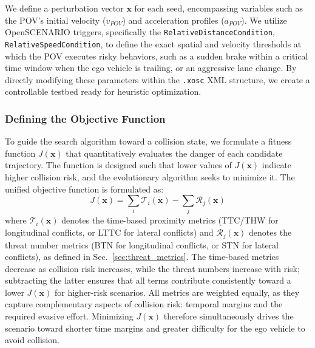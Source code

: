 We define a perturbation vector $\mathbf{x}$ for each seed, encompassing variables such as the POV's initial velocity ($v_{POV}$) and acceleration profiles ($a_{POV}$). We utilize OpenSCENARIO triggers, specifically the \texttt{RelativeDistanceCondition}, \texttt{RelativeSpeedCondition}, to define the exact spatial and velocity thresholds at which the POV executes risky behaviors, such as a sudden brake within a critical time window when the ego vehicle is trailing, or an aggressive lane change. By directly modifying these parameters within the \texttt{.xosc} XML structure, we create a controllable testbed ready for heuristic optimization.

\subsubsection{Defining the Objective Function}\label{sec:objective}
To guide the search algorithm toward a collision state, we formulate a fitness function $J(\mathbf{x})$ that quantitatively evaluates the danger of each candidate trajectory. The function is designed such that lower values of $J(\mathbf{x})$ indicate higher collision risk, and the evolutionary algorithm seeks to minimize it. The unified objective function is formulated as:
\begin{equation}
    J(\mathbf{x}) = \sum_{i} \mathcal{T}_{i}(\mathbf{x}) - \sum_{j} \mathcal{R}_{j}(\mathbf{x})
\end{equation}
where $\mathcal{T}_{i}(\mathbf{x})$ denotes the time-based proximity metrics (TTC/THW for longitudinal conflicts, or LTTC for lateral conflicts) and $\mathcal{R}_{j}(\mathbf{x})$ denotes the threat number metrics (BTN for longitudinal conflicts, or STN for lateral conflicts), as defined in Sec.~\ref{sec:threat_metrics}. The time-based metrics decrease as collision risk increases, while the threat numbers increase with risk; subtracting the latter ensures that all terms contribute consistently toward a lower $J(\mathbf{x})$ for higher-risk scenarios. All metrics are weighted equally, as they capture complementary aspects of collision risk: temporal margins and the required evasive effort. Minimizing $J(\mathbf{x})$ therefore simultaneously drives the scenario toward shorter time margins and greater difficulty for the ego vehicle to avoid collision.

